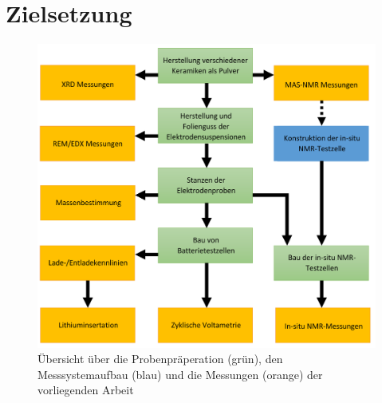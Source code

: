 \documentclass[a4paper, 11pt, headsepline,footsepline,twoside,abstract]{scrbook}
\begin{document}
\section{Zielsetzung}
\begin{figure}
	\centering
	\includegraphics[width=1.0\columnwidth]{images/Flowchart_Masterarbeit2.png}
	\caption{Übersicht über die Probenpräperation (grün), den Messsystemaufbau (blau) und die Messungen (orange) der vorliegenden Arbeit}
	\label{Flowchart_Masterarbeit}
\end{figure}
%
\end{document}
